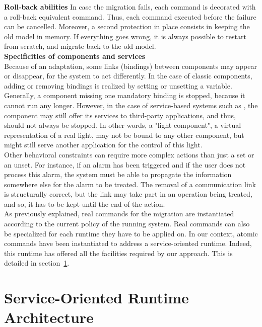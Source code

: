 {\bf Roll-back abilities}
In case the migration fails, each command is decorated with a roll-back equivalent command. Thus, each command executed before the failure can be cancelled. Moreover, a second protection in place consists in keeping the old model in memory. If everything goes wrong, it is always possible to restart from scratch, and migrate back to the old model.\\

{\bf Specificities of components and services}\\
Because of an adaptation, some links (bindings) between components may appear or disappear, for the system to act differently. In the case of classic components, adding or removing bindings is realized by setting or unsetting a variable. Generally, a component missing one mandatory binding is stopped, because it cannot run any longer. However, in the case of service-based systems such as \enti{}, the component may still offer its services to third-party applications, and thus, should not always be stopped. In other words, a "light component", a virtual representation of a real light, may not be bound to any other component, but might still serve another application for the control of this light.\\
Other behavioral constraints can require more complex actions than just a set or an unset. For instance, if an alarm has been triggered and if the user does not process this alarm, the system must be able to propagate the information somewhere else for the alarm to be treated. The removal of a communication link is structurally correct, but the link may take part in an operation being treated, and so, it has to be kept until the end of the action.\\

As previously explained, real commands for the migration are instantiated according to the current policy of the running system. Real commands can also be specialized for each runtime they have to be applied on. In our context, atomic commands have been instantiated to address a service-oriented runtime. Indeed, this runtime has offered all the facilities required by our approach. This is detailed in section~\ref{sec:soaruntime}.

\newpage
\section{Service-Oriented Runtime Architecture}
\label{sec:soaruntime}

